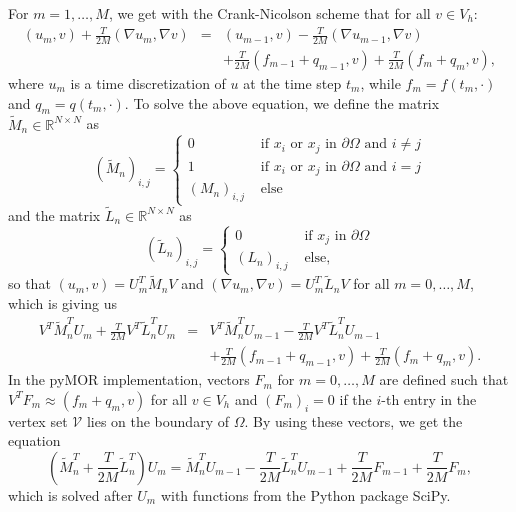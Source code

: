 For $m=1,\dotsc,M$, we get with the Crank-Nicolson scheme that for all $v\in V_h$:
\begin{eqnarray*}
(u_m,v) + \frac{T}{2M}(\nabla u_m, \nabla v) & = &(u_{m-1},v) - \frac{T}{2M}(\nabla u_{m-1}, \nabla v)\\
&& + \frac{T}{2M}(f_{m-1} + q_{m-1}, v) + \frac{T}{2M}(f_m + q_m, v),
\end{eqnarray*}
where $u_m$ is a time discretization of $u$ at the time step $t_m$, while $f_m=f(t_m, \cdot)$ and $q_m=q(t_m,\cdot)$. To solve the above equation, we define the matrix $\tilde{M}_n\in\mathbb{R}^{N\times N}$ as
\begin{displaymath}
\left(\tilde{M}_n\right)_{i,j}=\begin{cases}
0 & \text{ if $x_i$ or $x_j$ in $\partial\Omega$ and $i \neq j$}\\
1 & \text{ if $x_i$ or $x_j$ in $\partial\Omega$ and $i = j$}\\
\left(M_n\right)_{i,j} & \text{ else}
\end{cases}
\end{displaymath}
and the matrix $\tilde{L}_n\in\mathbb{R}^{N\times N}$ as
\begin{displaymath}
\left(\tilde{L}_n\right)_{i,j}=\begin{cases}
0 & \text{ if $x_j$ in $\partial\Omega$}\\
\left(L_n\right)_{i,j} & \text{ else,}
\end{cases}
\end{displaymath}
so that $(u_m,v)=U_m^T\tilde{M}_nV$ and $(\nabla u_m,\nabla v)=U_m^T\tilde{L}_nV$ for all $m=0,\dotsc,M$, which is giving us
\begin{eqnarray*}
V^T\tilde{M}_n^TU_m + \frac{T}{2M} V^T\tilde{L}_n^T U_m &=& V^T\tilde{M}_n^TU_{m-1} - \frac{T}{2M} V^T\tilde{L}_n^T U_{m-1}\\
&&  + \frac{T}{2M}(f_{m-1} + q_{m-1}, v) + \frac{T}{2M}(f_m + q_m, v).
\end{eqnarray*}
In the pyMOR implementation, vectors $F_m$ for $m=0,\dotsc,M$ are defined such that $V^TF_m\approx(f_m + q_m, v)$ for all $v\in V_h$ and $\left(F_m\right)_i=0$ if the $i$-th entry in the vertex set $\mathcal{V}$ lies on the boundary of $\Omega$. By using these vectors, we get the equation
\begin{equation}
\label{crank_nicolson}
\left(\tilde{M}_n^T + \frac{T}{2M} \tilde{L}_n^T\right) U_m = \tilde{M}_n^TU_{m-1} - \frac{T}{2M} \tilde{L}_n^T U_{m-1} + \frac{T}{2M} F_{m-1} + \frac{T}{2M} F_m,
\end{equation}
which is solved after $U_m$ with functions from the Python package SciPy.

